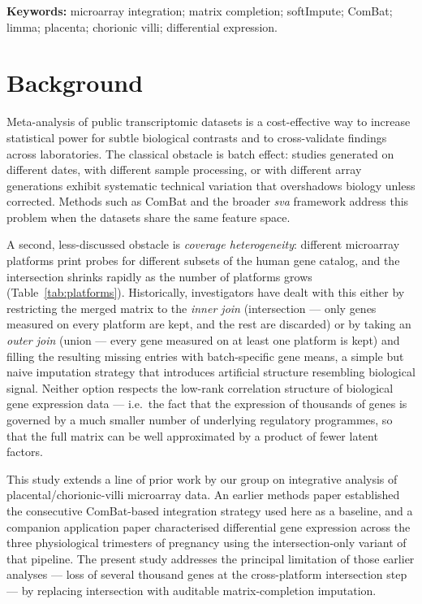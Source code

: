 \documentclass[11pt,a4paper]{article}
\begin{document}
\noindent\textbf{Keywords:} microarray integration; matrix
completion; softImpute; ComBat; limma; placenta; chorionic villi;
differential expression.

\vspace{1em}
\linenumbers

\section{Background}

Meta-analysis of public transcriptomic datasets is a
cost-effective way to increase statistical power for subtle
biological contrasts and to cross-validate findings across
laboratories. The classical obstacle is batch effect: studies
generated on different dates, with different sample processing,
or with different array generations exhibit systematic technical
variation that overshadows biology unless corrected. Methods
such as ComBat
\citep{Johnson2007} and the broader \textit{sva} framework
\citep{Leek2012} address this problem when the datasets share
the same feature space.

A second, less-discussed obstacle is \emph{coverage
heterogeneity}: different microarray platforms print probes for
different subsets of the human gene catalog, and the
intersection shrinks rapidly as the number of platforms grows
(Table~\ref{tab:platforms}).
Historically, investigators have dealt with this either by
restricting the merged matrix to the \emph{inner join}
(intersection --- only genes measured on every platform are
kept, and the rest are discarded) or by taking an \emph{outer
join} (union --- every gene measured on at least one platform
is kept) and filling the resulting missing entries with
batch-specific gene means, a simple but naive imputation
strategy that introduces artificial structure resembling
biological signal. Neither option respects the low-rank
correlation structure of biological gene expression data ---
i.e.\ the fact that the expression of thousands of genes is
governed by a much smaller number of underlying regulatory
programmes, so that the full matrix can be well approximated
by a product of fewer latent factors.

This study extends a line of prior work by our group on
integrative analysis of placental/chorionic-villi microarray data. An earlier
methods paper \citep{Lykhenko2021a} established the consecutive
ComBat-based integration strategy used here as a baseline,
and a companion application paper \citep{Lykhenko2021b}
characterised differential gene expression across the three
physiological trimesters of pregnancy using the
intersection-only variant of that pipeline. The present
study addresses the principal limitation of those earlier
analyses --- loss of several thousand genes at the
cross-platform intersection step --- by replacing intersection
with auditable matrix-completion imputation.
\end{document}
